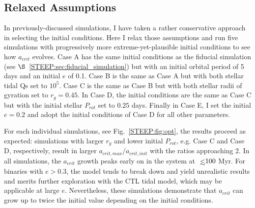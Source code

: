 \subsection{Relaxed Assumptions} \label{STEEP:sec:optimistic}

In previously-discussed simulations, I have taken a rather conservative approach in selecting the initial conditions.  Here I relax those assumptions and run five simulations with progressively more extreme-yet-plausible initial conditions to see how $a_{crit}$ evolves. Case A has the same initial conditions as the fiducial simulation (see $\S$~\ref{STEEP:sec:fiducial_simulation}) but with an initial orbital period of 5 days and an initial $e$ of 0.1.  Case B is the same as Case A but with both stellar tidal Qs set to $10^5$.  Case C is the same as Case B but with both stellar radii of gyration set to $r_g = 0.45$.  In Case D, the initial conditions are the same as Case C but with the initial stellar $P_{rot}$ set to $0.25$ days.  Finally in Case E, I set the initial $e=0.2$ and adopt the initial conditions of Case D for all other parameters.

For each individual simulations, see Fig.~\ref{STEEP:fig:opt}, the results proceed as expected: simulations with larger $r_g$ and lower initial $P_{rot}$, e.g. Case C and Case D, respectively, result in larger $a_{crit,max}$/$a_{crit,init}$ with the ratios approaching 2.  In all simulations, the $a_{crit}$ growth peaks early on in the system at $\lsim 100$ Myr.  For binaries with $e > 0.3$, the model tends to break down and yield unrealistic results and merits further exploration with the CTL tidal model, which may be applicable at large $e$.  Nevertheless, these simulations demonstrate that $a_{crit}$ can grow up to twice the initial value depending on the initial conditions.

